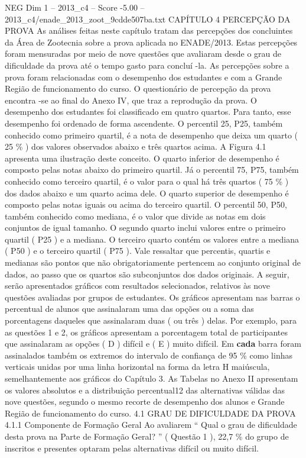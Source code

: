 \begin{textsample}{NEG Dim 1 – 2013\_c4 – Score -5.00 – 2013\_c4/enade\_2013\_zoot\_9cdde507ba.txt}  \label{ex:f1_neg_052}
CAPÍTULO 4 PERCEPÇÃO DA PROVA As análises feitas neste capítulo tratam das percepções dos concluintes da Área de Zootecnia sobre a prova aplicada no ENADE/2013.
Estas percepções foram mensuradas por meio de nove questões que avaliaram desde o grau de dificuldade da prova até o tempo gasto para concluí -la.
As percepções sobre a prova foram relacionadas com o desempenho dos estudantes e com a Grande Região de funcionamento do curso.
O questionário de percepção da prova encontra -se ao final do Anexo IV, que traz a reprodução da prova.
O desempenho dos estudantes foi classificado em quatro quartos.
Para tanto, esse desempenho foi ordenado de forma ascendente.
O percentil 25, P25, também conhecido como primeiro quartil, é a nota de desempenho que deixa um quarto ( 25 \% ) dos valores observados abaixo e três quartos acima.
A Figura 4.1 apresenta uma ilustração deste conceito.
O quarto inferior de desempenho é composto pelas notas abaixo do primeiro quartil.
Já o percentil 75, P75, também conhecido como terceiro quartil, é o valor para o qual há três quartos ( 75 \% ) dos dados abaixo e um quarto acima dele.
O quarto superior de desempenho é composto pelas notas iguais ou acima do terceiro quartil.
O percentil 50, P50, também conhecido como mediana, é o valor que divide as notas em dois conjuntos de igual tamanho.
O segundo quarto inclui valores entre o primeiro quartil ( P25 ) e a mediana.
O terceiro quarto contém os valores entre a mediana ( P50 ) e o terceiro quartil ( P75 ).
Vale ressaltar que percentis, quartis e medianas são pontos que não obrigatoriamente pertencem ao conjunto original de dados, ao passo que os quartos são subconjuntos dos dados originais.
A seguir, serão apresentados gráficos com resultados selecionados, relativos às nove questões avaliadas por grupos de estudantes.
Os gráficos apresentam nas barras o percentual de alunos que assinalaram uma das opções ou a soma das porcentagens daqueles que assinalaram duas ( ou três ) delas.
Por exemplo, para as questões 1 e 2, os gráficos apresentam a porcentagem total de participantes que assinalaram as opções ( D ) difícil e ( E ) muito difícil.
Em \textbf{cada} barra foram assinalados também os extremos do intervalo de confiança de 95 \% como linhas verticais unidas por uma linha horizontal na forma da letra H maiúscula, semelhantemente aos gráficos do Capítulo 3.
As Tabelas no Anexo II apresentam os valores absolutos e a distribuição percentual12 das alternativas válidas das nove questões, segundo o mesmo recorte de desempenho dos alunos e Grande Região de funcionamento do curso. 4.1 GRAU DE DIFICULDADE DA PROVA 4.1.1 Componente de Formação Geral Ao avaliarem “ Qual o grau de dificuldade desta prova na Parte de Formação Geral? ” ( Questão 1 ), 22,7 \% do grupo de inscritos e presentes optaram pelas alternativas difícil ou muito difícil.

\end{textsample}
